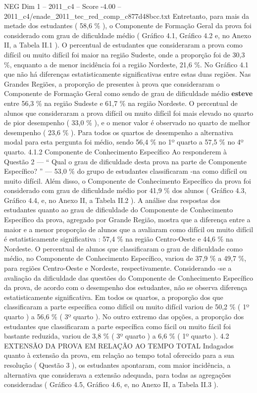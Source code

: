 \begin{textsample}{NEG Dim 1 – 2011\_c4 – Score -4.00 – 2011\_c4/enade\_2011\_tec\_red\_comp\_c877d48bcc.txt}
Entretanto, para mais da metade dos estudantes ( 58,6 \% ), o Componente de Formação Geral da prova foi considerado com grau de dificuldade médio ( Gráfico 4.1, Gráfico 4.2 e, no Anexo II, a Tabela II.1 ).
O percentual de estudantes que consideraram a prova como difícil ou muito difícil foi maior na região Sudeste, onde a proporção foi de 30,3 \%, enquanto a de menor incidência foi a região Nordeste, 21,6 \%.
No Gráfico 4.1 que não há diferenças estatisticamente significativas entre estas duas regiões.
Nas Grandes Regiões, a proporção de presentes à prova que consideraram o Componente de Formação Geral como sendo de grau de dificuldade médio \textbf{esteve} entre 56,3 \% na região Sudeste e 61,7 \% na região Nordeste.
O percentual de alunos que consideraram a prova difícil ou muito difícil foi mais elevado no quarto de pior desempenho ( 33,0 \% ), e o menor valor é observado no quarto de melhor desempenho ( 23,6 \% ).
Para todos os quartos de desempenho a alternativa modal para esta pergunta foi médio, sendo 56,4 \% no 1º quarto a 57,5 \% no 4º quarto. 4.1.2 Componente de Conhecimento Específico Ao responderem à Questão 2 — “ Qual o grau de dificuldade desta prova na parte de Componente Específico? ” — 53,0 \% do grupo de estudantes classificaram -na como difícil ou muito difícil.
Além disso, o Componente de Conhecimento Específico da prova foi considerado com grau de dificuldade médio por 41,9 \% dos alunos ( Gráfico 4.3, Gráfico 4.4, e, no Anexo II, a Tabela II.2 ).
A análise das respostas dos estudantes quanto ao grau de dificuldade do Componente de Conhecimento Específico da prova, agregado por Grande Região, mostra que a diferença entre a maior e a menor proporção de alunos que a avaliaram como difícil ou muito difícil é estatisticamente significativa : 57,4 \% na região Centro-Oeste e 44,6 \% na Nordeste.
O percentual de alunos que classificaram o grau de dificuldade como médio, no Componente de Conhecimento Específico, variou de 37,9 \% a 49,7 \%, para regiões Centro-Oeste e Nordeste, respectivamente.
Considerando -se a avaliação da dificuldade das questões do Componente de Conhecimento Específico da prova, de acordo com o desempenho dos estudantes, não se observa diferença estatisticamente significativa.
Em todos os quartos, a proporção dos que classificaram a parte específica como difícil ou muito difícil variou de 50,2 \% ( 1º quarto ) a 56,6 \% ( 3º quarto ).
No outro extremo das opções, a proporção dos estudantes que classificaram a parte específica como fácil ou muito fácil foi bastante reduzida, variou de 3,8 \% ( 3º quarto ) a 6,6 \% ( 1º quarto ). 4.2 EXTENSÃO DA PROVA EM RELAÇÃO AO TEMPO TOTAL Indagados quanto à extensão da prova, em relação ao tempo total oferecido para a sua resolução ( Questão 3 ), os estudantes apontaram, com maior incidência, a alternativa que considerava a extensão adequada, para todas as agregações consideradas ( Gráfico 4.5, Gráfico 4.6, e, no Anexo II, a Tabela II.3 ).

\end{textsample}
